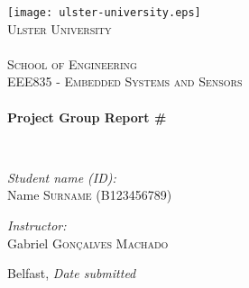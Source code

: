 \documentclass[12pt,a4paper]{article}
\begin{document}
\begin{titlepage}
\begin{center}

\texttt{[image: ulster-university.eps]}~\\[1cm]

\textsc{\LARGE Ulster University \\ \ \\ School of Engineering}\\[1.5cm]

\textsc{\Large EEE835 - Embedded Systems and Sensors}\\[0.5cm]

\HRule \\[0.4cm]
{ \huge \bfseries Project Group Report \#\\[0.4cm] }

\HRule \\[1.5cm]
\end{center}
\begin{minipage}{0.4\textwidth}
\begin{flushleft} \large
\emph{Student name (ID):}\\
Name \textsc{Surname} (B123456789) \\
\end{flushleft}
\end{minipage}
\begin{minipage}[b]{0.4\textwidth}
\begin{flushright} \large
\emph{Instructor:} \\
Gabriel  \textsc{Gon\c{c}alves Machado}
\end{flushright}
\end{minipage}

\vfill

\begin{center}
{\large Belfast, \textit{Date submitted}}
\end{center}

\end{titlepage}

\clearpage



\end{document}
